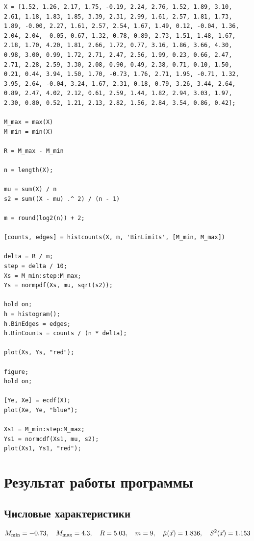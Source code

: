 \begin{lstlisting}
X = [1.52, 1.26, 2.17, 1.75, -0.19, 2.24, 2.76, 1.52, 1.89, 3.10, 2.61, 1.18, 1.83, 1.85, 3.39, 2.31, 2.99, 1.61, 2.57, 1.81, 1.73, 1.89, -0.00, 2.27, 1.61, 2.57, 2.54, 1.67, 1.49, 0.12, -0.04, 1.36, 2.04, 2.04, -0.05, 0.67, 1.32, 0.78, 0.89, 2.73, 1.51, 1.48, 1.67, 2.18, 1.70, 4.20, 1.81, 2.66, 1.72, 0.77, 3.16, 1.86, 3.66, 4.30, 0.98, 3.00, 0.99, 1.72, 2.71, 2.47, 2.56, 1.99, 0.23, 0.66, 2.47, 2.71, 2.28, 2.59, 3.30, 2.08, 0.90, 0.49, 2.38, 0.71, 0.10, 1.50, 0.21, 0.44, 3.94, 1.50, 1.70, -0.73, 1.76, 2.71, 1.95, -0.71, 1.32, 3.95, 2.64, -0.04, 3.24, 1.67, 2.31, 0.18, 0.79, 3.26, 3.44, 2.64, 0.89, 2.47, 4.02, 2.12, 0.61, 2.59, 1.44, 1.82, 2.94, 3.03, 1.97, 2.30, 0.80, 0.52, 1.21, 2.13, 2.82, 1.56, 2.84, 3.54, 0.86, 0.42];

M_max = max(X)
M_min = min(X)

R = M_max - M_min

n = length(X);

mu = sum(X) / n
s2 = sum((X - mu) .^ 2) / (n - 1)

m = round(log2(n)) + 2;

[counts, edges] = histcounts(X, m, 'BinLimits', [M_min, M_max])

delta = R / m;
step = delta / 10;
Xs = M_min:step:M_max;
Ys = normpdf(Xs, mu, sqrt(s2));

hold on;
h = histogram();
h.BinEdges = edges;
h.BinCounts = counts / (n * delta);

plot(Xs, Ys, "red");

figure;
hold on;

[Ye, Xe] = ecdf(X);
plot(Xe, Ye, "blue");

Xs1 = M_min:step:M_max;
Ys1 = normcdf(Xs1, mu, s2);
plot(Xs1, Ys1, "red");
\end{lstlisting}

\section{Результат работы программы}

\subsection{Числовые характеристики}
\begin{equation*}
 M_{\min} = -0.73, \quad M_{\max} = 4.3, \quad R = 5.03, \quad m = 9, \quad \hat\mu(\vec x) = 1.836, \quad S^2(\vec x) = 1.153 \\
\end{equation*}

